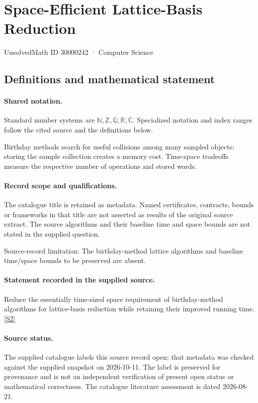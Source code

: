 \documentclass[11pt]{article}
\newcommand{\sref}[2]{\hyperlink{source:#1:#2}{[S#2]}}
\begin{document}
\setcounter{section}{30000241}
\section{Space-Efficient Lattice-Basis Reduction}\label{30000242}
{\small\sffamily UnsolvedMath ID 30000242 · Computer Science}
\subsection{Definitions and mathematical statement}

\paragraph{Shared notation.}Standard number systems are $\mathbb N,\mathbb Z,\mathbb Q,\mathbb R,\mathbb C$. Specialized notation and index ranges follow the cited source and the definitions below.


Birthday methods search for useful collisions among many sampled objects; storing the sample collection creates a memory cost. Time-space tradeoffs measure the respective number of operations and stored words.
\paragraph{Record scope and qualifications.}
The catalogue title is retained as metadata. Named certificates, contracts, bounds or frameworks in that title are not asserted as results of the original source extract.
The source algorithms and their baseline time and space bounds are not stated in the supplied question.

Source-record limitation: The birthday-method lattice algorithms and baseline time/space bounds to be preserved are absent.
\paragraph{Statement recorded in the supplied source.}
Reduce the essentially time-sized space requirement of birthday-method algorithms for lattice-basis reduction while retaining their improved running time. \sref{30000242}{2}
\paragraph{Source status.}
The supplied catalogue labels this source record open; that metadata was checked against the supplied snapshot on 2026-10-11. The label is preserved for provenance and is not an independent verification of present open status or mathematical correctness. The catalogue literature assessment is dated 2026-08-21.
\end{document}

